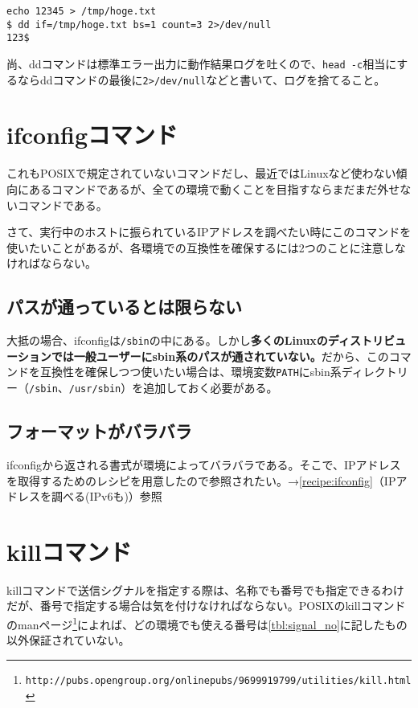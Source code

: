 \begin{screen}
	\verb|echo 12345 > /tmp/hoge.txt| \return \\
	\verb|$ dd if=/tmp/hoge.txt bs=1 count=3 2>/dev/null| \return \\
	\verb|123$ |
\end{screen}

尚、ddコマンドは標準エラー出力に動作結果ログを吐くので、\verb|head -c|相当にするならddコマンドの最後に\verb|2>/dev/null|などと書いて、ログを捨てること。

\section{ifconfigコマンド}

これもPOSIXで規定されていないコマンドだし、最近ではLinuxなど使わない傾向にあるコマンドであるが、全ての環境で動くことを目指すならまだまだ外せないコマンドである。

さて、実行中のホストに振られているIPアドレスを調べたい時にこのコマンドを使いたいことがあるが、各環境での互換性を確保するには2つのことに注意しなければならない。

\subsection*{パスが通っているとは限らない}

大抵の場合、ifconfigは\verb|/sbin|の中にある。しかし\textbf{多くのLinuxのディストリビューションでは一般ユーザーにsbin系のパスが通されていない。}だから、このコマンドを互換性を確保しつつ使いたい場合は、環境変数\verb|PATH|にsbin系ディレクトリー（\verb|/sbin|、\verb|/usr/sbin|）を追加しておく必要がある。

\subsection*{フォーマットがバラバラ}

ifconfigから返される書式が環境によってバラバラである。そこで、IPアドレスを取得するためのレシピを用意したので参照されたい。→\ref{recipe:ifconfig}（IPアドレスを調べる(IPv6も)）参照

\section{killコマンド}
\label{allenvs:kill}

killコマンドで送信シグナルを指定する際は、名称でも番号でも指定できるわけだが、番号で指定する場合は気を付けなければならない。POSIXのkillコマンドのmanページ\footnote{\verb|http://pubs.opengroup.org/onlinepubs/9699919799/utilities/kill.html|}によれば、どの環境でも使える番号は\ref{tbl:signal_no}に記したもの以外保証されていない。


